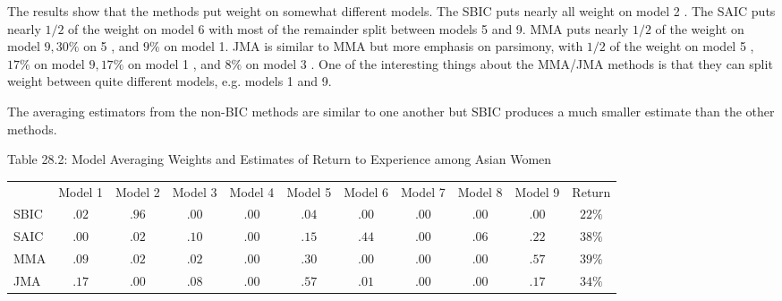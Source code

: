 \documentclass[10pt]{article}
\begin{document}
The results show that the methods put weight on somewhat different models. The SBIC puts nearly all weight on model 2 . The SAIC puts nearly $1 / 2$ of the weight on model 6 with most of the remainder split between models 5 and 9. MMA puts nearly $1 / 2$ of the weight on model $9,30 \%$ on 5 , and $9 \%$ on model 1. JMA is similar to MMA but more emphasis on parsimony, with $1 / 2$ of the weight on model 5 , $17 \%$ on model $9,17 \%$ on model 1 , and $8 \%$ on model 3 . One of the interesting things about the MMA/JMA methods is that they can split weight between quite different models, e.g. models 1 and 9.

The averaging estimators from the non-BIC methods are similar to one another but SBIC produces a much smaller estimate than the other methods.

Table 28.2: Model Averaging Weights and Estimates of Return to Experience among Asian Women

\begin{tabular}{lcccccccccc}
\hline\hline
 & Model 1 & Model 2 & Model 3 & Model 4 & Model 5 & Model 6 & Model 7 & Model 8 & Model 9 & Return \\
SBIC & $.02$ & $.96$ & $.00$ & $.00$ & $.04$ & $.00$ & $.00$ & $.00$ & $.00$ & $22 \%$ \\
SAIC & $.00$ & $.02$ & $.10$ & $.00$ & $.15$ & $.44$ & $.00$ & $.06$ & $.22$ & $38 \%$ \\
MMA & $.09$ & $.02$ & $.02$ & $.00$ & $.30$ & $.00$ & $.00$ & $.00$ & $.57$ & $39 \%$ \\
JMA & $.17$ & $.00$ & $.08$ & $.00$ & $.57$ & $.01$ & $.00$ & $.00$ & $.17$ & $34 \%$ \\
\end{tabular}
\end{document}
